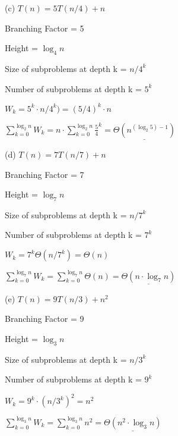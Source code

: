 \documentclass{article} %
\begin{document}
    \vspace{5pt}

    (c) $T(n) = 5T(n / 4) + n$

    \hspace{13pt} Branching Factor = 5
    
    \hspace{13pt} Height = $\log_4n $

    \hspace{13pt} Size of subproblems at depth k = $n / 4^k$
    
    \hspace{13pt} Number of subproblems at depth k = $5^k$

    \hspace{13pt} $W_k = 5^k \cdot n/4^k) = (5/4)^k \cdot n$

    \hspace{13pt} $\sum^{\log_2 n}_{k = 0} W_k = n \cdot \sum^{\log_2 n}_{k = 0} \frac{5}{4}^k = \underline{\Theta(n^{(\log_2 5) - 1})}$

    \vspace{5pt} 

    (d) $T(n) = 7T(n / 7) + n$

    \hspace{13pt} Branching Factor = 7
    
    \hspace{13pt} Height = $\log_7n $

    \hspace{13pt} Size of subproblems at depth k = $n / 7^k$
    
    \hspace{13pt} Number of subproblems at depth k = $7^k$

    \hspace{13pt} $W_k = 7^k \Theta(n/7^k) = \Theta(n)$

    \hspace{13pt} $\sum^{\log_7 n}_{k = 0} W_k = \sum^{\log_7 n}_{k = 0} \Theta(n) = \underline{\Theta(n \cdot \log_7n)}$

    \vspace{5pt}

    (e) $T(n) = 9T(n / 3) + n^2$

    \hspace{13pt} Branching Factor = 9
    
    \hspace{13pt} Height = $\log_3n $

    \hspace{13pt} Size of subproblems at depth k = $n / 3^k$
    
    \hspace{13pt} Number of subproblems at depth k = $9^k$

    \hspace{13pt} $W_k = 9^k \cdot (n/3^k)^2 = n^2$

    \hspace{13pt} $\sum^{\log_3 n}_{k = 0} W_k = \sum^{\log_3 n}_{k = 0} n^2 = \underline{\Theta(n^2 \cdot \log_3n)}$
\end{document}
